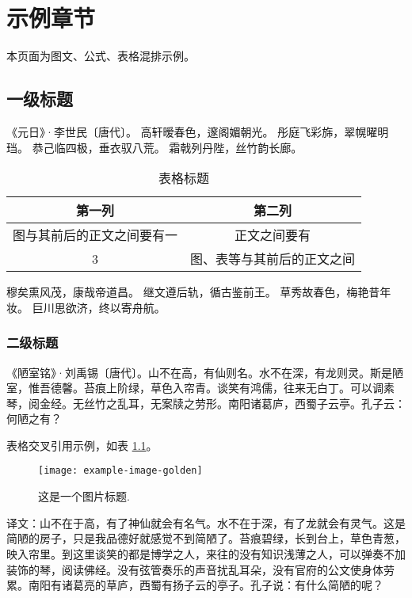 \chapter{示例章节}

本页面为图文、公式、表格混排示例。

\section{一级标题}
\thispagestyle{fancy}
《元日》·李世民〔唐代〕。
高轩暧春色，邃阁媚朝光。
彤庭飞彩旆，翠幌曜明珰。
恭己临四极，垂衣驭八荒。
霜戟列丹陛，丝竹韵长廊。

\begin{table}[!h]
    \centering
    \caption{表格标题}
    \label{tab:exp1}
    \tabfont %
    \begin{tabular}{cc}
        \toprule
        第一列                     & 第二列                     \\
        \midrule
        图与其前后的正文之间要有一 & 正文之间要有               \\
        3                          & 图、表等与其前后的正文之间 \\
        \bottomrule
    \end{tabular}
\end{table}

穆矣熏风茂，康哉帝道昌。
继文遵后轨，循古鉴前王。
草秀故春色，梅艳昔年妆。
巨川思欲济，终以寄舟航。

\subsection{二级标题}
《陋室铭》·刘禹锡〔唐代〕。山不在高，有仙则名。水不在深，有龙则灵。斯是陋室，惟吾德馨。苔痕上阶绿，草色入帘青。谈笑有鸿儒，往来无白丁。可以调素琴，阅金经。无丝竹之乱耳，无案牍之劳形。南阳诸葛庐，西蜀子云亭。孔子云：何陋之有？

表格交叉引用示例，如表 \ref{tab:exp1}。

\begin{figure}[!h]
    \centering
    \texttt{[image: example-image-golden]}
    \caption{这是一个图片标题.}
    \label{fig:exp1}
\end{figure}

译文：山不在于高，有了神仙就会有名气。水不在于深，有了龙就会有灵气。这是简陋的房子，只是我品德好就感觉不到简陋了。苔痕碧绿，长到台上，草色青葱，映入帘里。到这里谈笑的都是博学之人，来往的没有知识浅薄之人，可以弹奏不加装饰的琴，阅读佛经。没有弦管奏乐的声音扰乱耳朵，没有官府的公文使身体劳累。南阳有诸葛亮的草庐，西蜀有扬子云的亭子。孔子说：有什么简陋的呢？

